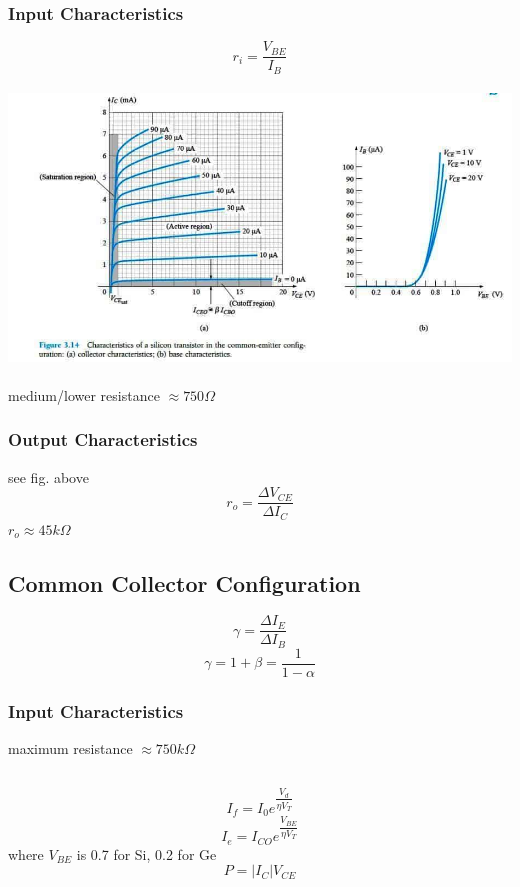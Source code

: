 \documentclass[10pt, a4paper]{report}
\begin{document}
	\subsubsection{Input Characteristics}
	$$r_i = \dfrac{V_{BE}}{I_B}$$\\
	\includegraphics[width=\linewidth]{img/oputputcharacteristicsceconfiguration}\\\\
	medium/lower resistance $\approx 750 \Omega$
	\subsubsection{Output Characteristics}
	see fig. above
	$$r_o = \dfrac{\Delta V_{CE}}{\Delta I_C}$$
	$ r_o \approx 45 k\Omega $
	\subsection{Common Collector Configuration}
	$$\gamma = \dfrac{\Delta I_E}{\Delta I_B}$$
	$$\gamma = 1 + \beta = \dfrac{1}{1-\alpha}$$
	\subsubsection{Input Characteristics}
	maximum resistance $\approx 750 k\Omega$
	\subsection{}
	$$ I_f = I_0e^{\dfrac{V_d}{\eta V_T}} $$
	$$ I_e = I_{CO}e^{\dfrac{V_{BE}}{\eta V_T}} $$
	where $ V_{BE} $ is 0.7 for Si, 0.2 for Ge
	$$ P = |I_C| V_{CE} $$
\end{document}
